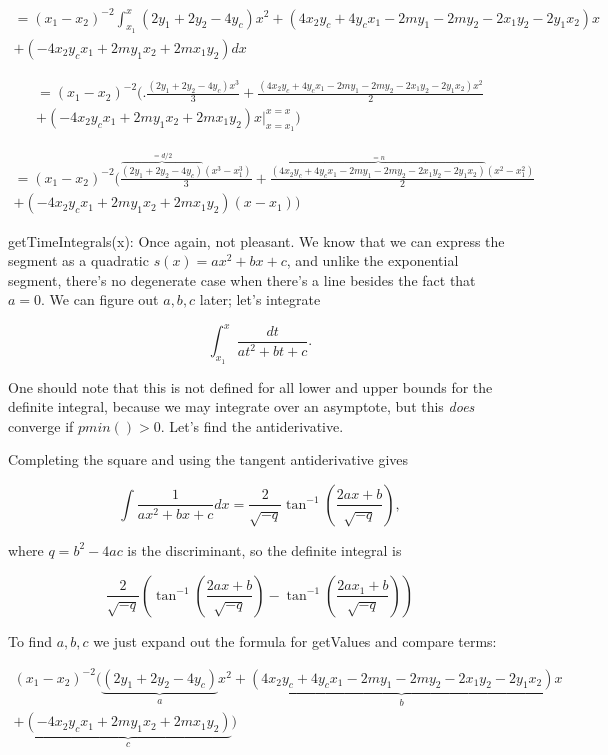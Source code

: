 \documentclass{article}
\begin{document}
\begin{multline*}
=(x_1-x_2)^{-2} \int_{x_1}^x (2y_1+2y_2-4y_c)x^2 + (4 x_2 y_c + 4 y_c x_1 - 2 m y_1 - 2 m y_2 - 2 x_1 y_2 - 2 y_1 x_2) x \\ + (-4 x_2 y_c x_1 + 2 m y_1 x_2 + 2 m x_1 y_2) dx
\end{multline*}

\begin{multline*}
=(x_1-x_2)^{-2} \biggl(\bigl.\frac{(2y_1+2y_2-4y_c)x^3}{3} + \frac{(4 x_2 y_c + 4 y_c x_1 - 2 m y_1 - 2 m y_2 - 2 x_1 y_2 - 2 y_1 x_2) x^2}{2} \\ + (-4 x_2 y_c x_1 + 2 m y_1 x_2 + 2 m x_1 y_2)x\bigr\vert _ {x=x_1} ^ {x=x}\biggr)
\end{multline*}

\begin{multline*}
=(x_1-x_2)^{-2} \biggl(\frac{\overbrace{(2y_1+2y_2-4y_c)}^{=d/2}(x^3-x_1^3)}{3} + \frac{\overbrace{(4 x_2 y_c + 4 y_c x_1 - 2 m y_1 - 2 m y_2 - 2 x_1 y_2 - 2 y_1 x_2)}^{=n} (x^2-x_1^2)}{2} \\ + (-4 x_2 y_c x_1 + 2 m y_1 x_2 + 2 m x_1 y_2)(x-x_1)\biggr)
\end{multline*}

getTimeIntegrals(x): Once again, not pleasant. We know that we can express the segment as a quadratic $s(x)=ax^2+bx+c$, and unlike the exponential segment, there's no degenerate case when there's a line besides the fact that $a=0$. We can figure out $a,b,c$ later; let's integrate

$$\int_{x_1}^x \frac{dt}{at^2+bt+c}.$$

One should note that this is not defined for all lower and upper bounds for the definite integral, because we may integrate over an asymptote, but this \textit{does} converge if $pmin() > 0$. Let's find the antiderivative.

Completing the square and using the tangent antiderivative gives

$$\int \frac{1}{ax^2+bx+c}dx = \frac{2}{\sqrt{-q}}\tan^{-1}\left(\frac{2ax+b}{\sqrt{-q}}\right),$$

where $q=b^2-4ac$ is the discriminant, so the definite integral is

$$\frac{2}{\sqrt{-q}}\left(\tan^{-1}\left(\frac{2ax+b}{\sqrt{-q}}\right)-\tan^{-1}\left(\frac{2ax_1+b}{\sqrt{-q}}\right)\right)$$

To find $a,b,c$ we just expand out the formula for getValues and compare terms:

\begin{multline*}
(x_1-x_2)^{-2}(\underbrace{(2y_1+2y_2-4y_c)}_ax^2 + \underbrace{(4 x_2 y_c + 4 y_c x_1 - 2 m y_1 - 2 m y_2 - 2 x_1 y_2 - 2 y_1 x_2)}_b x \\ + \underbrace{(-4 x_2 y_c x_1 + 2 m y_1 x_2 + 2 m x_1 y_2)}_c)
\end{multline*}
\end{document}
